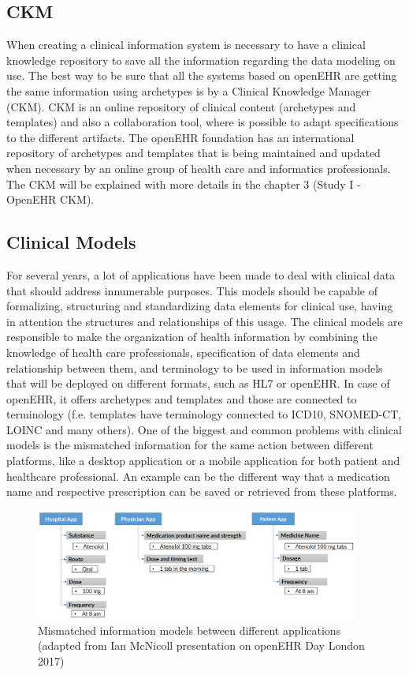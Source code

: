 \documentclass[mim_thesis.tex]{subfiles}
\begin{document}
\subsection{CKM}
When creating a clinical information system is necessary to have a clinical knowledge repository to save all the information regarding the data modeling on use. The best way to be sure that all the systems based on openEHR are getting the same information using archetypes is by a Clinical Knowledge Manager (CKM). CKM is an online repository of clinical content (archetypes and templates) and also a collaboration tool, where is possible to adapt specifications to the different artifacts. The openEHR foundation has an international repository of archetypes and templates that is being maintained and updated when necessary by an online group of health care and informatics professionals. The CKM will be explained with more details in the chapter 3 (Study I - OpenEHR CKM).

\subsection{Clinical Models}
For several years, a lot of applications have been made to deal with clinical data that should address innumerable purposes. This models should be capable of formalizing, structuring and standardizing data elements for clinical use, having in attention the structures and relationships of this usage. The clinical models are responsible to make the organization of health information by combining the knowledge of health care professionals, specification of data elements and relationship between them, and terminology to be used in information models that will be deployed on different formats, such as HL7 or openEHR. In case of openEHR, it offers archetypes and templates and those are connected to terminology (f.e. templates have terminology connected to ICD10, SNOMED-CT, LOINC and many others). One of the biggest and common problems with clinical models is the mismatched information for the same action between different platforms, like a desktop application or a mobile application for both patient and healthcare professional. An example can be the different way that a medication name and respective prescription can be saved or retrieved from these platforms.

\begin{figure}[H]
	\centering
    \includegraphics[width=0.95\textwidth]{img/mismatched_IM.PNG}
	\caption{Mismatched information models between different applications (adapted from Ian McNicoll presentation on openEHR Day London 2017)}
	\label{fig:mismatched_IM}
\end{figure}
\end{document}

